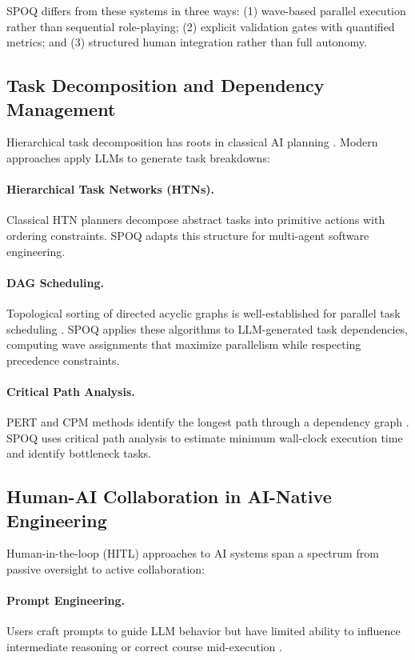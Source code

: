 \medskip
SPOQ differs from these systems in three ways: (1) wave-based parallel execution
rather than sequential role-playing; (2) explicit validation gates with quantified
metrics; and (3) structured human integration rather than full autonomy.

\subsection{Task Decomposition and Dependency Management}

Hierarchical task decomposition has roots in classical AI planning \citep{nau2003shop2}.
Modern approaches apply LLMs to generate task breakdowns:

\paragraph{Hierarchical Task Networks (HTNs).} Classical HTN planners decompose
abstract tasks into primitive actions with ordering constraints. SPOQ adapts
this structure for multi-agent software engineering.

\paragraph{DAG Scheduling.} Topological sorting of directed acyclic graphs is
well-established for parallel task scheduling \citep{coffman1972optimal}. SPOQ
applies these algorithms to LLM-generated task dependencies, computing wave
assignments that maximize parallelism while respecting precedence constraints.

\paragraph{Critical Path Analysis.} PERT and CPM methods identify the longest
path through a dependency graph \citep{kelley1959critical}. SPOQ uses critical
path analysis to estimate minimum wall-clock execution time and identify
bottleneck tasks.

\newpage
\subsection{Human-AI Collaboration in AI-Native Engineering}

Human-in-the-loop (HITL) approaches to AI systems span a spectrum from passive
oversight to active collaboration:

\paragraph{Prompt Engineering.} Users craft prompts to guide LLM behavior but
have limited ability to influence intermediate reasoning or correct course
mid-execution \citep{white2023prompt}.

